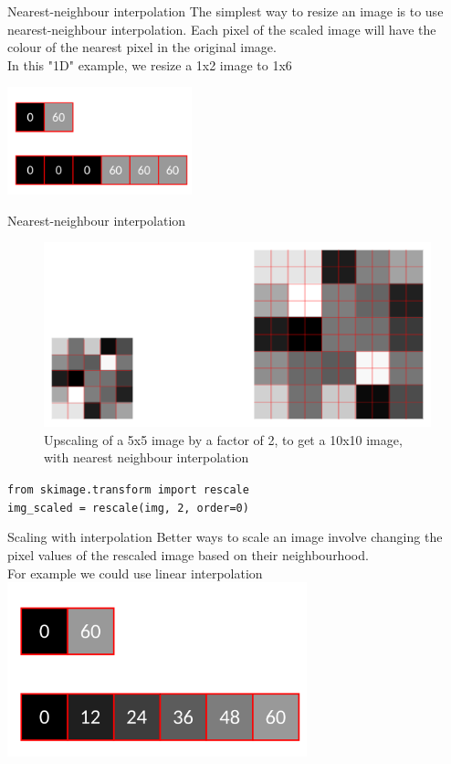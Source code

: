 \documentclass[9pt, aspectratio=169]{beamer}
\begin{document}
\begin{frame}
    {Nearest-neighbour interpolation}
    The simplest way to resize an image is to use nearest-neighbour interpolation. Each pixel of the scaled image will have the colour of the nearest pixel in the original image.\\

    In this "1D" example, we resize a 1x2 image to 1x6

    \centering
    \includegraphics[width = 0.4\textwidth]{1D_NN_interpolation.png}
\end{frame}

\begin{frame}
    {Nearest-neighbour interpolation}
    \begin{figure}
        \centering
        \includegraphics[width=.65\textwidth]{upscaling_no_interpolation.png}
        \caption{Upscaling of a 5x5 image by a factor of 2, to get a 10x10 image, with nearest neighbour interpolation}
    \end{figure}
    \pause
    \begin{codebox}
        \texttt{from skimage.transform import rescale\\
            img\_scaled = rescale(img, 2, order=0)}
    \end{codebox}
\end{frame}

\begin{frame}
    {Scaling with interpolation}
    Better ways to scale an image involve changing the pixel values of the rescaled image based on their neighbourhood.\\
    For example we could use linear interpolation
    \centering
    \includegraphics[width=0.65\textwidth]{1D_lin_interpolation.png}
\end{frame}
\end{document}
